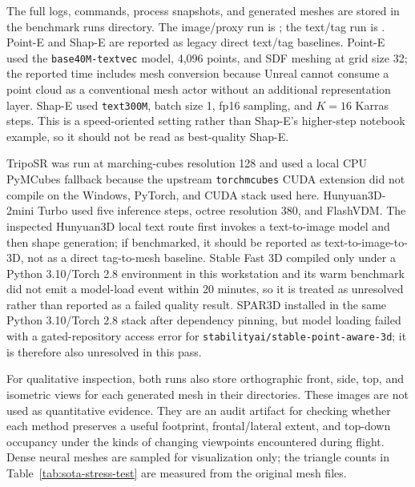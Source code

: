﻿\documentclass[11pt,a4paper]{article}
\begin{document}
The full logs, commands, process snapshots, and generated meshes are stored in
the benchmark runs directory. The image/proxy run is ;
the text/tag run is . Point-E and Shap-E are reported as legacy direct text/tag baselines. Point-E used the
\texttt{base40M-textvec} model, 4,096
points, and SDF meshing at grid size 32; the reported time includes mesh
conversion because Unreal cannot consume a point cloud as a conventional mesh
actor without an additional representation layer. Shap-E used \texttt{text300M},
batch size 1, fp16 sampling, and \(K=16\) Karras steps. This is a speed-oriented
setting rather than Shap-E's higher-step notebook example, so it should not be
read as best-quality Shap-E.

TripoSR \cite{tochilkin2024triposr} was run at marching-cubes resolution 128 and used a local CPU PyMCubes
fallback because the upstream \texttt{torchmcubes} CUDA extension did not
compile on the Windows, PyTorch, and CUDA stack used here. Hunyuan3D-2mini Turbo
used five inference steps, octree resolution 380, and FlashVDM. The
inspected Hunyuan3D local text route first invokes a text-to-image model and then
shape generation; if benchmarked, it should be reported as text-to-image-to-3D,
not as a direct tag-to-mesh baseline. Stable Fast 3D compiled only under a
Python 3.10/Torch 2.8 environment in this workstation and its warm benchmark did
not emit a model-load event within 20 minutes, so it is treated as unresolved
rather than reported as a failed quality result. SPAR3D installed in the same
Python 3.10/Torch 2.8 stack after dependency pinning, but model loading failed
with a gated-repository access error for
\texttt{stabilityai/stable-point-aware-3d}; it is therefore also unresolved in
this pass.

For qualitative inspection, both runs also store orthographic front, side, top,
and isometric views for each generated mesh in their  directories.
These images
are not used as quantitative evidence. They are an audit artifact for checking
whether each method preserves a useful footprint, frontal/lateral extent, and
top-down occupancy under the kinds of changing viewpoints encountered during
flight. Dense neural meshes are sampled for visualization only; the triangle
counts in Table~\ref{tab:sota-stress-test} are measured from the original mesh
files.
\end{document}

